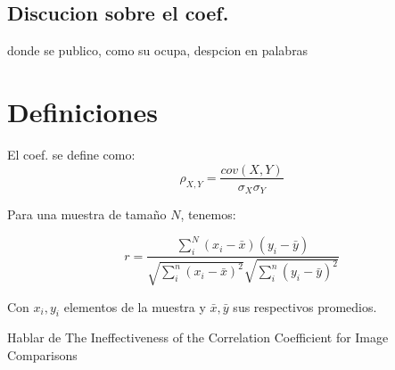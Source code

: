 	\subsection{Discucion sobre el coef.}
	
		donde se publico, como su ocupa, despcion en palabras
	 
	\section{Definiciones}
	
	El coef. se define como:
	\begin{equation}\label{pearson_orig}
		\rho_{X,Y}=\frac{cov(X,Y)}{\sigma_X\sigma_Y}
	\end{equation}
	
	Para una muestra de tama\~no $N$, tenemos:
	
	\begin{equation}\label{pearson_r}
		r=\frac{\sum_{i}^N\left(x_{i}-\bar{x}\right)\left(y_{i}-\bar{y}\right)}{\sqrt{\sum_{i}^n\left(x_{i}-\bar{x}\right)^{2}} \sqrt{\sum_{i}^n\left(y_{i}-\bar{y}\right)^{2}}}
	\end{equation}
	
	Con $x_i,y_i$ elementos de la muestra y $\bar{x},\bar{y}$ sus respectivos promedios.
	
	Hablar de The Ineffectiveness of the Correlation Coefficient for Image Comparisons
	
	\newpage